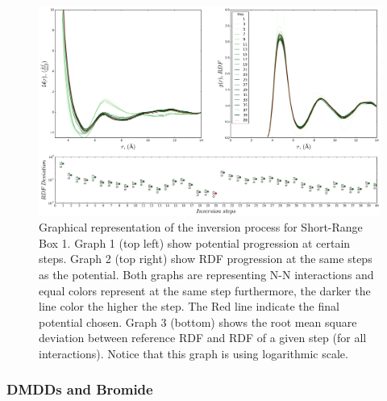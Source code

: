 \documentclass[10pt,a4paper,twoside]{article}
\begin{document}
\begin{figure}[H]
  \begin{center}
	\includegraphics[width=.8 \textwidth]{./graphs/Conv45nns}
	\caption{\small{Graphical representation of the inversion process for Short-Range Box 1. Graph 1 (top left) show potential progression at certain steps. Graph 2 (top right) show RDF progression at the same steps as the potential. Both graphs are representing N-N interactions and equal colors represent at the same step furthermore, the darker the line color the higher the step. The Red line indicate the final potential chosen.  Graph 3 (bottom) shows the root mean square deviation between reference RDF and RDF of a given step (for all interactions). Notice that this graph is using logarithmic scale.}}
	\label{Fig:Conv45nns}
  \end{center}
\end{figure}

\subsubsection{DMDDs and Bromide}
\end{document}
